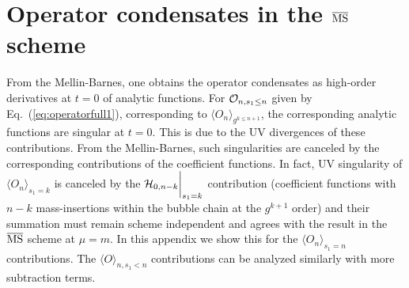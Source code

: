 \documentclass[a4paper,11pt]{article}
\begin{document}
\section{Operator condensates in the $\overline{\rm MS}$ scheme}\label{sec:operatorms}
From the Mellin-Barnes, one obtains the operator condensates as high-order derivatives at $t=0$ of analytic functions. For ${\cal O}_{n,s_1\le n}$ given by Eq.~(\ref{eq:operatorfull1}), corresponding to $\langle O_n \rangle_{g^{k\le n+1}}$, the corresponding analytic functions are singular at $t=0$. This is due to the UV divergences of these contributions. From the Mellin-Barnes, such singularities are canceled by the corresponding contributions of the coefficient functions. In fact, UV singularity of $\langle O_n\rangle_{s_1=k}$ is canceled by the ${\cal H}_{0,n-k}\bigg|_{s_1=k}$ contribution (coefficient functions with $n-k$ mass-insertions within the bubble chain at the $g^{k+1}$ order) and their summation must remain scheme independent and agrees with the result in the $\overline{\rm MS}$ scheme at $\mu=m$. In this appendix we show this for the  $\langle O_n\rangle_{s_1=n}$ contributions. The $\langle O\rangle_{n,s_1<n}$ contributions can be analyzed similarly with more subtraction terms. 
\end{document}
